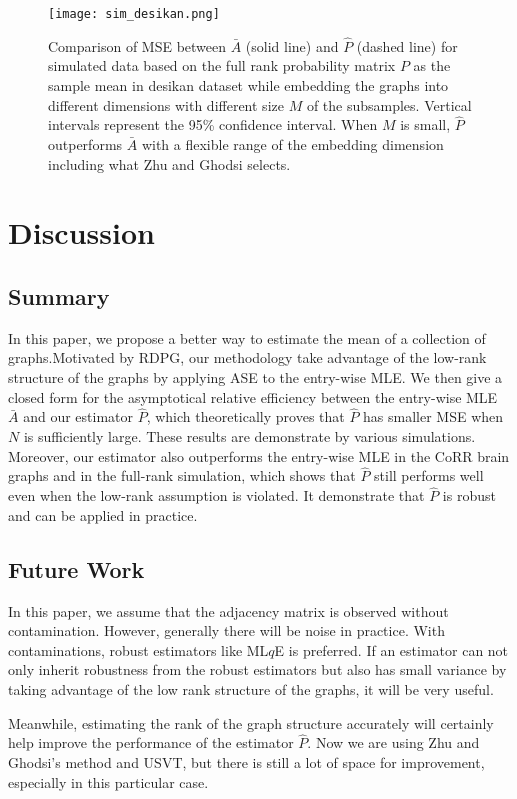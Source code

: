 \documentclass[a4paper]{article}
\begin{document}
\begin{figure}[!htb]
\centering
\texttt{[image: sim\_desikan.png]}
\caption{Comparison of MSE between $\bar{A}$ (solid line) and $\hat{P}$ (dashed line) for simulated data based on the full rank probability matrix $P$ as the sample mean in desikan dataset while embedding the graphs into different dimensions with different size $M$ of the subsamples. Vertical intervals represent the 95\% confidence interval. When $M$ is small, $\hat{P}$ outperforms $\bar{A}$ with a flexible range of the embedding dimension including what Zhu and Ghodsi selects.}
\label{fig:sim_desikan}
\end{figure}



\section{Discussion}

\subsection{Summary}
In this paper, we propose a better way to estimate the mean of a collection of graphs.Motivated by RDPG, our methodology take advantage of the low-rank structure of the graphs by applying ASE to the entry-wise MLE. We then give a closed form for the asymptotical relative efficiency between the entry-wise MLE $\bar{A}$ and our estimator $\hat{P}$, which theoretically proves that $\hat{P}$ has smaller MSE when $N$ is sufficiently large. These results are demonstrate by various simulations. Moreover, our estimator also outperforms the entry-wise MLE in the CoRR brain graphs and in the full-rank simulation, which shows that $\hat{P}$ still performs well even when the low-rank assumption is violated. It demonstrate that $\hat{P}$ is robust and can be applied in practice.


\subsection{Future Work}
In this paper, we assume that the adjacency matrix is observed without contamination. However, generally there will be noise in practice. With contaminations, robust estimators like ML$q$E is preferred. If an estimator can not only inherit robustness from the robust estimators but also has small variance by taking advantage of the low rank structure of the graphs, it will be very useful.

Meanwhile, estimating the rank of the graph structure accurately will certainly help improve the performance of the estimator $\hat{P}$. Now we are using Zhu and Ghodsi's method and USVT, but there is still a lot of space for improvement, especially in this particular case.
\end{document}
